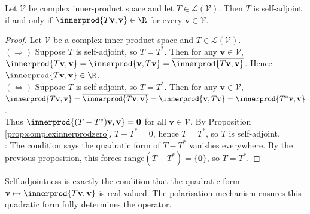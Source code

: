 \begin{corollary} Let $\mathcal{V}$ be complex inner-product space and let $T \in \mathcal{L}(\mathcal{V})$. Then $T$ is self-adjoint if and only if $\innerprod{T \mathbf{v}, \mathbf{v}} \in \R$ for every $\mathbf{v} \in \mathcal{V}$.
\begin{proof} Let $\mathcal{V}$ be a complex inner-product space and $T \in \mathcal{L}(\mathcal{V})$.\\
$(\Rightarrow)$ Suppose $T$ is self-adjoint, so $T = T^*$. Then for any $\mathbf{v} \in \mathcal{V}$, $\innerprod{T \mathbf{v}, \mathbf{v}} = \innerprod{\mathbf{v}, T \mathbf{v}} = \overline{\innerprod{T \mathbf{v}, \mathbf{v}}}$. Hence $\innerprod{T \mathbf{v}, \mathbf{v}} \in \R$.\\
$(\Leftrightarrow)$ Suppose $T$ is self-adjoint, so $T = T^*$. Then for any $\mathbf{v} \in \mathcal{V}$, $\innerprod{T \mathbf{v}, \mathbf{v}} = \overline{\innerprod{T \mathbf{v}, \mathbf{v}}} = \innerprod{\mathbf{v}, T\mathbf{v}} = \innerprod{T^* \mathbf{v}, \mathbf{v}}$.\\
Thus $\innerprod{(T - T^*) \mathbf{v}, \mathbf{v}} = \mathbf{0}$ for all $\mathbf{v} \in \mathcal{V}$. By Proposition \ref{prop:complexinnerprodzero}, $T - T^* = 0$, hence $T = T^*$, so $T$ is self-adjoint.\\
: The condition says the quadratic form of $T - T^*$ vanishes everywhere. By the previous proposition, this forces $\text{range}(T - T^*) = \{ \mathbf{0} \}$, so $T = T^*.$
\end{proof}
\end{corollary}

Self-adjointness is exactly the condition that the quadratic form $\mathbf{v} \mapsto \innerprod{T \mathbf{v}, \mathbf{v}}$ is real-valued. The polarisation mechanism ensures this quadratic form fully determines the operator.

